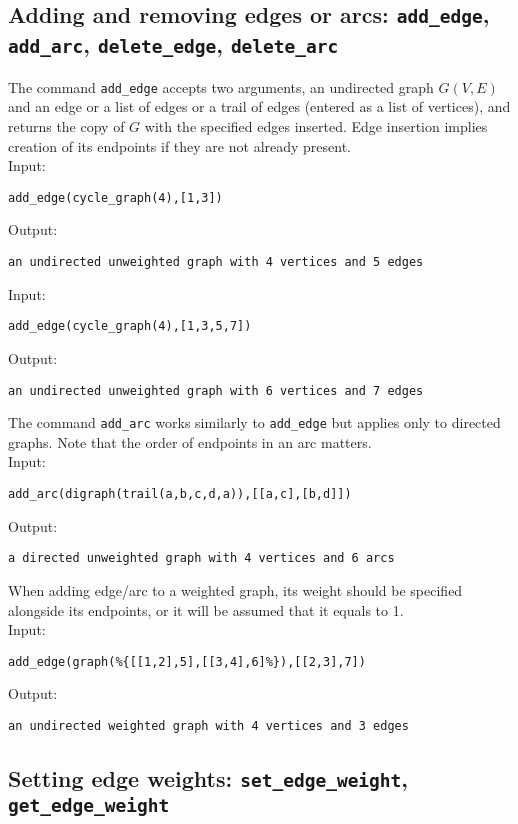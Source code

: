 \documentclass[a4paper,11pt]{article}
\begin{document}
\subsection{Adding and removing edges or arcs: {\tt add\_edge}, {\tt add\_arc}, {\tt delete\_edge}, {\tt delete\_arc}}

The command {\tt add\_edge} accepts two arguments, an undirected graph $ G(V,E) $ and an edge or a list of edges or a trail of edges (entered as a list of vertices), and returns the copy of $ G $ with the specified edges inserted. Edge insertion implies creation of its endpoints if they are not already present.\\
Input:
\begin{center}
  \tt add\_edge(cycle\_graph(4),[1,3])
\end{center}
Output:
\begin{center}
  \tt an undirected unweighted graph with 4 vertices and 5 edges
\end{center}
Input:
\begin{center}
  \tt add\_edge(cycle\_graph(4),[1,3,5,7])
\end{center}
Output:
\begin{center}
  \tt an undirected unweighted graph with 6 vertices and 7 edges
\end{center}

The command {\tt add\_arc} works similarly to {\tt add\_edge} but applies only to directed graphs. Note that the order of endpoints in an arc matters.\\
Input:
\begin{center}
  \tt add\_arc(digraph(trail(a,b,c,d,a)),[[a,c],[b,d]])
\end{center}
Output:
\begin{center}
  \tt a directed unweighted graph with 4 vertices and 6 arcs
\end{center}

When adding edge/arc to a weighted graph, its weight should be specified alongside its endpoints, or it will be assumed that it equals to 1.\\
Input:
\begin{center}
  \tt add\_edge(graph(\%\{[[1,2],5],[[3,4],6]\%\}),[[2,3],7])
\end{center}
Output:
\begin{center}
  \tt an undirected weighted graph with 4 vertices and 3 edges
\end{center}

\subsection{Setting edge weights: {\tt set\_edge\_weight}, {\tt get\_edge\_weight}}
\end{document}
